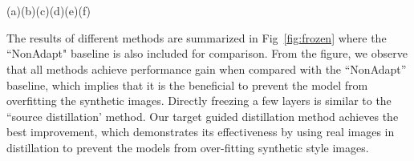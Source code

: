 \documentclass[10pt,twocolumn,letterpaper]{article}
\begin{document}
\begin{figure*}[h]
      \\

      \\



      \vspace{2mm}
      (a)\hspace{0.15\linewidth}(b)\hspace{0.15\linewidth}(c)\hspace{0.15\linewidth}(d)\hspace{0.15\linewidth}(e)\hspace{0.15\linewidth}(f)
      \vspace{2mm}
        \caption{Qualitative semantic segmentation results on the Cityscapes: (a) original image, (b) ground truth annotation, (c) NonAdapt baseline, (d) our model using target guided distillation only, (e) our model using spatial aware adaptation only, (f) our final ROAD-Net model.}
        \vspace{-2mm}
\label{fig:qualitative}
\end{figure*}


The results of different methods are summarized in Fig~\ref{fig:frozen} where the ``NonAdapt" baseline is also included for comparison. From the figure, we observe that all methods achieve performance gain when compared with the ``NonAdapt'' baseline, which implies that it is the beneficial to prevent the model from overfitting the synthetic images. Directly freezing a few layers is similar to the ``source distillation' method. Our target guided distillation method achieves the best improvement, which demonstrates its effectiveness by using real images in distillation to prevent the models from over-fitting synthetic style images. 
\end{document}
